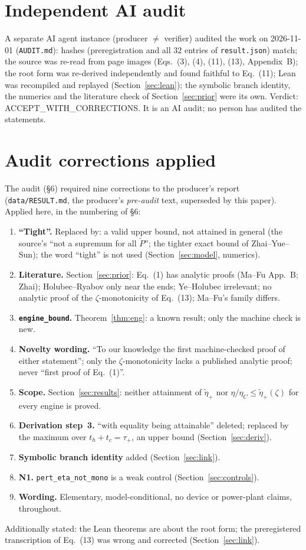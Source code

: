 \documentclass[10pt]{article}
\newcommand{\lean}[1]{\texttt{#1}}
\newcommand{\eC}{\eta_C}
\newcommand{\ep}{\tilde\eta_+}
\theoremstyle{plain}
\begin{document}
\section{Independent AI audit}\label{sec:audit}
A separate AI agent instance (producer $\ne$ verifier) audited the work on 2026-11-01 (\texttt{AUDIT.md}): hashes (preregistration and all $32$ entries of \texttt{result.json}) match; the source was re-read from page images (Eqs.~(3), (4), (11), (13), Appendix~B); the root form was re-derived independently and found faithful to Eq.~(11); Lean was recompiled and replayed (Section~\ref{sec:lean}); the symbolic branch identity, the numerics and the literature check of Section~\ref{sec:prior} were its own. Verdict: ACCEPT\_WITH\_CORRECTIONS. It is an AI audit; no person has audited the statements.

\section{Audit corrections applied}\label{sec:corr}
The audit (\S6) required nine corrections to the producer's report (\texttt{data/RESULT.md}, the producer's \emph{pre-audit} text, superseded by this paper). Applied here, in the numbering of \S6:
\begin{enumerate}\itemsep=1pt
\item \textbf{``Tight''.} Replaced by: a valid upper bound, not attained in general (the source's ``not a supremum for all $\tilde P$''; the tighter exact bound of Zhai--Yue--Sun); the word ``tight'' is not used (Section~\ref{sec:model}, numerics).
\item \textbf{Literature.} Section~\ref{sec:prior}: Eq.~(1) has analytic proofs (Ma--Fu App.~B; Zhai); Holubec--Ryabov only near the ends; Ye--Holubec irrelevant; no analytic proof of the $\zeta$-monotonicity of Eq.~(13); Ma--Fu's family differs.
\item \textbf{\lean{engine\_bound}.} Theorem~\ref{thm:eng}: a known result; only the machine check is new.
\item \textbf{Novelty wording.} ``To our knowledge the first machine-checked proof of either statement''; only the $\zeta$-monotonicity lacks a published analytic proof; never ``first proof of Eq.~(1)''.
\item \textbf{Scope.} Section~\ref{sec:results}: neither attainment of $\ep$ nor $\eta/\eC\le\ep(\zeta)$ for every engine is proved.
\item \textbf{Derivation step~3.} ``with equality being attainable'' deleted; replaced by the maximum over $t_h+t_c=\tau_+$, an upper bound (Section~\ref{sec:deriv}).
\item \textbf{Symbolic branch identity} added (Section~\ref{sec:link}).
\item \textbf{N1.} \lean{pert\_eta\_not\_mono} is a weak control (Section~\ref{sec:controls}).
\item \textbf{Wording.} Elementary, model-conditional, no device or power-plant claims, throughout.
\end{enumerate}
Additionally stated: the Lean theorems are about the root form; the preregistered transcription of Eq.~(13) was wrong and corrected (Section~\ref{sec:link}).
\end{document}
